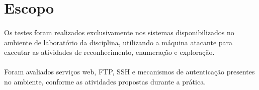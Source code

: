 \section{Escopo}

\paragraph{}
Os testes foram realizados exclusivamente nos sistemas disponibilizados no
ambiente de laboratório da disciplina, utilizando a máquina atacante para
executar as atividades de reconhecimento, enumeração e exploração.

\paragraph{}
Foram avaliados serviços web, FTP, SSH e mecanismos de autenticação presentes
no ambiente, conforme as atividades propostas durante a prática.
